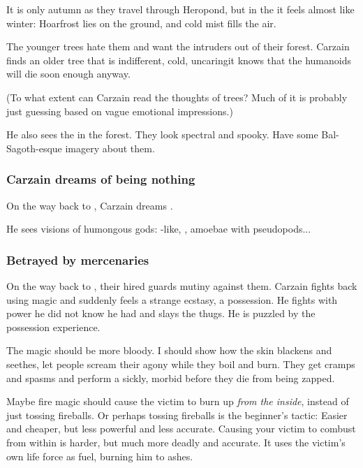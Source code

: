 \begin{garbage}
It is only autumn as they travel through Heropond, but in the \Wylde{} it feels almost like winter: Hoarfrost lies on the ground, and cold mist fills the air.

The younger trees hate them and want the intruders out of their forest. Carzain finds an older tree that is indifferent, cold, uncaring\dash it knows that the humanoids will die soon enough anyway. 

(To what extent can Carzain read the thoughts of trees? Much of it is probably just guessing based on vague emotional impressions.)

He also sees the  in the forest. They look spectral and spooky. Have some Bal-Sagoth-esque imagery about them.






\subsubsection{Carzain dreams of being nothing}
On the way back to \hs\Redglen, Carzain dreams . 

He sees visions of humongous gods: 
\Human-like, \dragons, amoebae with pseudopods...





\subsubsection{Betrayed by mercenaries}
On the way back to \hs\Redglen, their hired guards mutiny against them. Carzain fights back using magic and suddenly feels a strange ecstasy, a possession. He fights with power he did not know he had and slays the thugs. He is puzzled by the possession experience. 

The magic should be more bloody. I should show how the skin blackens and seethes, let people scream their agony while they boil and burn. They get cramps and spasms and perform a sickly, morbid  before they die from being zapped. 

Maybe fire magic should cause the victim to burn up \emph{from the inside}, instead of just tossing fireballs. Or perhaps tossing fireballs is the beginner's tactic: Easier and cheaper, but less powerful and less accurate. Causing your victim to combust from within is harder, but much more deadly and accurate. It uses the victim's own life force as fuel, burning him to ashes. 


\end{garbage}

